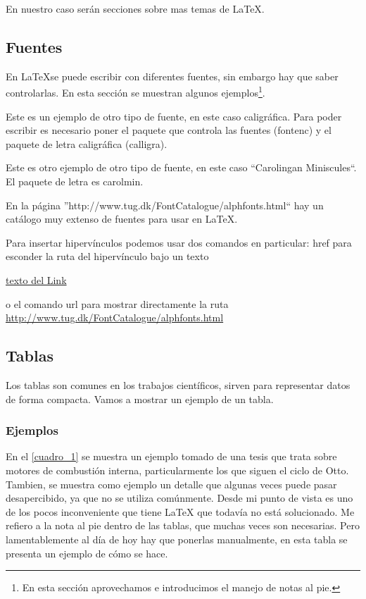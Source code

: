 \documentclass[a4paper,11pt]{article}
\begin{document}
En nuestro caso serán secciones sobre mas temas de \LaTeX.

\subsection{Fuentes}

En \LaTeX se puede escribir con diferentes fuentes, sin embargo hay que saber controlarlas. En esta sección se muestran algunos ejemplos\footnote{En esta sección aprovechamos e introducimos el manejo de notas al pie.}.

Este es un ejemplo de otro tipo de fuente, en este caso caligráfica. Para poder escribir es necesario poner el paquete que controla las fuentes (fontenc) y el paquete de letra caligráfica (calligra).

Este es otro ejemplo de otro tipo de fuente, en este caso ``Carolingan Miniscules``. El paquete de letra es carolmin.

\normalfont
En la página ''http://www.tug.dk/FontCatalogue/alphfonts.html`` hay un catálogo muy extenso de fuentes para usar en \LaTeX. 

Para insertar hipervínculos podemos usar dos comandos en particular: href para esconder la ruta del hipervínculo bajo un texto

\href{http://www.tug.dk/FontCatalogue/alphfonts.html}{texto del Link}

o el comando url para mostrar directamente la ruta
\url{http://www.tug.dk/FontCatalogue/alphfonts.html}

\subsection{Tablas}
Los tablas son comunes en los trabajos científicos, sirven para representar datos de forma compacta. Vamos a mostrar un ejemplo de un tabla.

\subsubsection{Ejemplos}
\label{ej_fonts}
En el \autoref{cuadro_1} se muestra un ejemplo tomado de una tesis que trata sobre motores de combustión interna, particularmente los que siguen el ciclo de Otto. Tambien, se muestra como ejemplo un detalle que algunas veces puede pasar desapercibido, ya que no se utiliza comúnmente. Desde mi punto de vista es uno de los pocos inconveniente que tiene LaTeX que todavía no está solucionado. Me refiero a la nota al pie dentro de las tablas, que muchas veces son necesarias. Pero lamentablemente al día de hoy hay que ponerlas manualmente, en esta tabla se presenta un ejemplo de cómo se hace.
\end{document}
